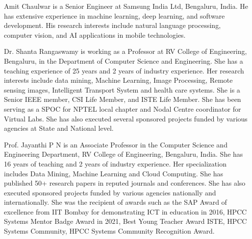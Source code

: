 \documentclass{ieeeaccess}
\begin{document}
\vspace{-2.5cm}
\begin{IEEEbiography}{Amit Chaulwar} is a Senior Engineer at Samsung India Ltd, Bengaluru, India. He has extensive experience in machine learning, deep learning, and software development. His research interests include natural language processing, computer vision, and AI applications in mobile technologies.
\end{IEEEbiography}

\vspace{-2.5cm}
\begin{IEEEbiography}{Dr. Shanta Rangaswamy} is working as a Professor at RV College of Engineering, Bengaluru, in the Department of Computer Science and Engineering. She has a teaching experience of 25 years and 2 years of industry experience. Her research interests include data mining, Machine Learning, Image Processing, Remote sensing images, Intelligent Transport System and health care systems. She is a Senior IEEE member, CSI Life Member, and ISTE Life Member. She has been serving as a SPOC for NPTEL local chapter and Nodal Centre coordinator for Virtual Labs. She has also executed several sponsored projects funded by various agencies at State and National level.
    \end{IEEEbiography}

\vspace{-2.5cm}
\begin{IEEEbiography}{Prof. Jayanthi P N} is an Associate Professor in the Computer Science and Engineering Department, RV College of Engineering, Bengaluru, India. She has 16 years of teaching and 2 years of industry experience. Her specialization includes Data Mining, Machine Learning and Cloud Computing. She has published 50+ research papers in reputed journals and conferences. She has also executed sponsored projects funded by various agencies nationally and internationally. She was the recipient of awards such as the SAP Award of excellence from IIT Bombay for demonstrating ICT in education in 2016, HPCC Systems Mentor Badge Award in 2021, Best Young Teacher Award ISTE, HPCC Systems Community, HPCC Systems Community Recognition Award.
    \end{IEEEbiography}


\setlength{\parskip}{\baselineskip}

\EOD
\end{document}
